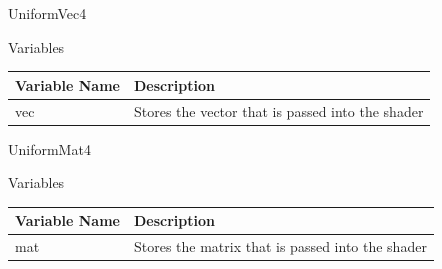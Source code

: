 \documentclass{article}
\begin{document}
                UniformVec4
                \begin{center}
                    Variables
                    \begin{tabular}{ | m{} | m{} | }
                        \hline
                        \textbf{Variable Name} & \textbf{Description} \\
                        \hline
                        vec & Stores the vector that is passed into the shader \\
                        \hline
                    \end{tabular}
                \end{center}
                UniformMat4
                \begin{center}
                    Variables
                    \begin{tabular}{ | m{} | m{} | }
                        \hline
                        \textbf{Variable Name} & \textbf{Description} \\
                        \hline
                        mat & Stores the matrix that is passed into the shader \\
                        \hline
                    \end{tabular}
                \end{center}
            \clearpage
\end{document}

